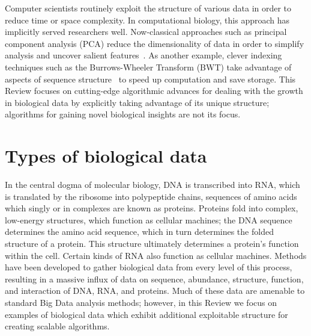 \documentclass{acm_proc_article-sp}
\begin{document}
Computer scientists routinely exploit the structure of various data in
order to reduce time or space complexity.
In computational biology, this approach has implicitly served researchers well.
Now-classical approaches such as principal component analysis (PCA) reduce the 
dimensionality of data in order to simplify analysis and uncover salient 
features~\cite{berger2013computational}.
As another example, clever indexing techniques such as the Burrows-Wheeler 
Transform (BWT) take advantage of aspects of sequence 
structure~\cite{berger2013computational} to speed up computation and save storage.
This Review focuses on cutting-edge algorithmic advances for dealing with the growth in 
biological data by explicitly taking advantage of its unique structure; algorithms for gaining novel biological insights are not its 
focus.


\section{Types of biological data}

In the central dogma of molecular biology, DNA is transcribed into RNA, which
is translated by the ribosome into polypeptide chains, sequences of amino 
acids which singly or in complexes are known as proteins.
Proteins fold into complex, low-energy structures, which function as
cellular machines; the DNA sequence determines the amino acid sequence,
which in turn determines the folded structure of a protein.
This structure ultimately determines a protein's function within the cell.
Certain kinds of RNA also function as cellular 
machines.
Methods have been developed to gather biological data from every level of this process,
resulting in a massive influx of data on sequence, abundance, structure, function, and interaction of DNA, RNA, and proteins.
Much of these data are amenable to standard Big Data analysis methods; however, in this Review we focus on examples of biological data which exhibit additional exploitable structure for creating scalable algorithms.
\end{document}
